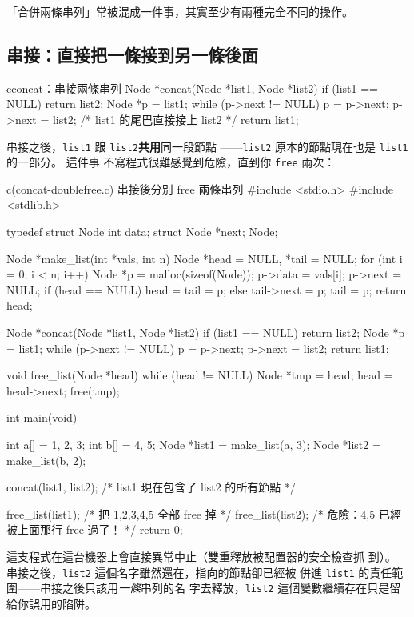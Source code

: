 「合併兩條串列」常被混成一件事，其實至少有兩種完全不同的操作。

\subsection{串接：直接把一條接到另一條後面}

\begin{code}{c}{concat：串接兩條串列}
Node *concat(Node *list1, Node *list2) {
    if (list1 == NULL) return list2;
    Node *p = list1;
    while (p->next != NULL) p = p->next;
    p->next = list2; /* list1 的尾巴直接接上 list2 */
    return list1;
}
\end{code}

串接之後，\texttt{list1} 跟 \texttt{list2}\textbf{共用}同一段節點
——\texttt{list2} 原本的節點現在也是 \texttt{list1} 的一部分。 這件事
不寫程式很難感覺到危險，直到你 \texttt{free} 兩次：

\begin{example}{c}{(concat-doublefree.c) 串接後分別 free 兩條串列}
#include <stdio.h>
#include <stdlib.h>

typedef struct Node {
    int data;
    struct Node *next;
} Node;

Node *make_list(int *vals, int n) {
    Node *head = NULL, *tail = NULL;
    for (int i = 0; i < n; i++) {
        Node *p = malloc(sizeof(Node));
        p->data = vals[i];
        p->next = NULL;
        if (head == NULL) head = tail = p;
        else { tail->next = p; tail = p; }
    }
    return head;
}

Node *concat(Node *list1, Node *list2) {
    if (list1 == NULL) return list2;
    Node *p = list1;
    while (p->next != NULL) p = p->next;
    p->next = list2;
    return list1;
}

void free_list(Node *head) {
    while (head != NULL) {
        Node *tmp = head;
        head = head->next;
        free(tmp);
    }
}

int main(void) {
    int a[] = {1, 2, 3};
    int b[] = {4, 5};
    Node *list1 = make_list(a, 3);
    Node *list2 = make_list(b, 2);

    concat(list1, list2); /* list1 現在包含了 list2 的所有節點 */

    free_list(list1);  /* 把 1,2,3,4,5 全部 free 掉 */
    free_list(list2);  /* 危險：4,5 已經被上面那行 free 過了！ */
    return 0;
}
\end{example}

這支程式在這台機器上會直接異常中止（雙重釋放被配置器的安全檢查抓
到）。 串接之後，\texttt{list2} 這個名字雖然還在，指向的節點卻已經被
併進 \texttt{list1} 的責任範圍——串接之後只該用\textit{一條}串列的名
字去釋放，\texttt{list2} 這個變數繼續存在只是留給你誤用的陷阱。

